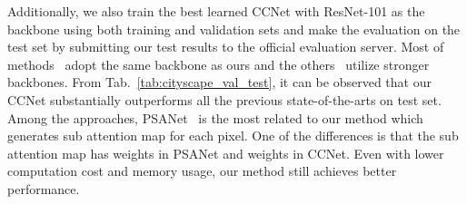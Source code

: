 \documentclass[10pt,journal,compsoc]{IEEEtran}
\begin{document}
Additionally, we also train the best learned CCNet with ResNet-101 as the backbone using both training and validation sets and make the evaluation on the test set by submitting our test results to the official evaluation server. Most of methods~\cite{chen2018deeplab, lin2017refinenet, zhang2017scale, peng2017large, wang2018understanding, zhao2017pyramid, yu2018bisenet, ke2018adaptive, zhao2018psanet, yu2018learning} adopt the same backbone as ours and the others~\cite{wu2016wider,yang2018denseaspp} utilize stronger backbones. 
From Tab.~\ref{tab:cityscape_val_test}, it can be observed that our CCNet substantially outperforms all the previous state-of-the-arts on test set.
Among the approaches, PSANet~\cite{zhao2018psanet} is the most related to our method which generates sub attention map for each pixel. One of the differences is that the sub attention map has  weights in PSANet and   weights in CCNet. Even with lower computation cost and memory usage, our method still achieves better performance.
    
\end{document}
